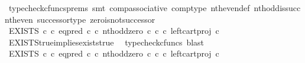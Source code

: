 \begin{isabellebody}
\ {\isacharparenleft}{\kern0pt}typecheck{\isacharunderscore}{\kern0pt}cfuncs{\isacharunderscore}{\kern0pt}prems{\isacharcomma}{\kern0pt}\ smt\ comp{\isacharunderscore}{\kern0pt}associative{}\ comp{\isacharunderscore}{\kern0pt}type\ nth{\isacharunderscore}{\kern0pt}even{\isacharunderscore}{\kern0pt}def{}\ nth{\isacharunderscore}{\kern0pt}odd{\isacharunderscore}{\kern0pt}is{\isacharunderscore}{\kern0pt}succ{\isacharunderscore}{\kern0pt}nth{\isacharunderscore}{\kern0pt}even\ successor{\isacharunderscore}{\kern0pt}type\ zero{\isacharunderscore}{\kern0pt}is{\isacharunderscore}{\kern0pt}not{\isacharunderscore}{\kern0pt}successor{\isacharparenright}{\kern0pt}\isanewline
\ \ \ \ \isamarkupfalse%
\isanewline
\ \ \ \ \isamarkupfalse%
\ \isamarkupfalse%
\ {\isachardoublequoteopen}EXISTS\ {\isasymnat}\isactrlsub c\ {\isasymcirc}\isactrlsub c\ {\isacharparenleft}{\kern0pt}{\isacharparenleft}{\kern0pt}eq{\isacharunderscore}{\kern0pt}pred\ {\isasymnat}\isactrlsub c\ {\isasymcirc}\isactrlsub c\ {\isasymlangle}nth{\isacharunderscore}{\kern0pt}odd{\isacharcomma}{\kern0pt}zero\ {\isasymcirc}\isactrlsub c\ {\isasymbeta}\isactrlbsub {\isasymnat}\isactrlsub c\isactrlesub {\isasymrangle}{\isacharparenright}{\kern0pt}\ {\isasymcirc}\isactrlsub c\ left{\isacharunderscore}{\kern0pt}cart{\isacharunderscore}{\kern0pt}proj\ {\isasymnat}\isactrlsub c\ {\isasymone}{\isacharparenright}{\kern0pt}\isactrlsup {\isasymsharp}\ {\isasymnoteq}\ {\isasymt}{\isachardoublequoteclose}\isanewline
\ \ \ \ \ \ \isamarkupfalse%
\ EXISTS{\isacharunderscore}{\kern0pt}true{\isacharunderscore}{\kern0pt}implies{\isacharunderscore}{\kern0pt}exists{\isacharunderscore}{\kern0pt}true\ \isamarkupfalse%
\ {\isacharparenleft}{\kern0pt}typecheck{\isacharunderscore}{\kern0pt}cfuncs{\isacharcomma}{\kern0pt}\ blast{\isacharparenright}{\kern0pt}\isanewline
\ \ \ \ \isamarkupfalse%
\ \isamarkupfalse%
\ {\isachardoublequoteopen}EXISTS\ {\isasymnat}\isactrlsub c\ {\isasymcirc}\isactrlsub c\ {\isacharparenleft}{\kern0pt}{\isacharparenleft}{\kern0pt}eq{\isacharunderscore}{\kern0pt}pred\ {\isasymnat}\isactrlsub c\ {\isasymcirc}\isactrlsub c\ {\isasymlangle}nth{\isacharunderscore}{\kern0pt}odd{\isacharcomma}{\kern0pt}zero\ {\isasymcirc}\isactrlsub c\ {\isasymbeta}\isactrlbsub {\isasymnat}\isactrlsub c\isactrlesub {\isasymrangle}{\isacharparenright}{\kern0pt}\ {\isasymcirc}\isactrlsub c\ left{\isacharunderscore}{\kern0pt}cart{\isacharunderscore}{\kern0pt}proj\ {\isasymnat}\isactrlsub c\ {\isasymone}{\isacharparenright}{\kern0pt}\isactrlsup {\isasymsharp}\ {\isacharequal}{\kern0pt}\ {\isasymf}{\isachardoublequoteclose}\isanewline

\end{isabellebody}
